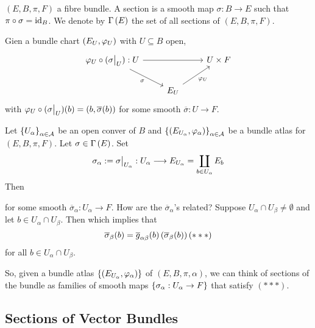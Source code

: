 \documentclass[main.tex]{subfiles}
\begin{document}
 $(E, B, \pi, F)$ a fibre bundle. A section is a smooth map $\sigma: B \to E$ such that $\pi \circ \sigma = \text{id}_{B}$. We denote by $\Gamma\left( E \right)$ the set of all sections of $(E, B, \pi, F)$. 

Gien a bundle chart $\left(  E_U, \varphi_U \right)$ with $U \subseteq B$ open,
\[
\begin{tikzcd}
\varphi_U \circ (\sigma \big|_U) : U \arrow[rd, "\sigma"'] \arrow[rr] &                              & U \times F \\
                                                                      & E_U \arrow[ru, "\varphi_U"'] &           
\end{tikzcd}
\]
with $\varphi_U \circ (\sigma\big|_{U})(b) = (b, \overline{\sigma}(b))$ for some smooth $\overline{\sigma}: U \to F.$

Let $\left\{U_\alpha\right\}_{\alpha \in \mathcal{A}}$ be an open conver of $B$
 and $\left\{ \left( E_{U_\alpha}, \varphi_\alpha \right) \right\}_{\alpha \in \mathcal{A}}$ be
 a bundle atlas for $(E, B, \pi, F)$. Let $\sigma \in \Gamma\left( E \right)$. Set 
 \[
 \sigma_\alpha := \sigma\big|_{U_\alpha}: U_\alpha \longrightarrow E_{U_\alpha} = \coprod_{b \in U_\alpha} E_b
 \]
 Then 
 
 for some smooth $\overline{\sigma}_\alpha: U_\alpha \to F$. How are the $\overline{\sigma}_\alpha$'s related? Suppose $U_\alpha \cap U_\beta \neq \emptyset$  and let $b \in U_\alpha \cap U_\beta$. Then
 which implies that 
 \[
    \overline{\sigma}_\beta(b) = \overline{g}_{\alpha\beta}(b)\left( \overline{\sigma}_\beta(b)  \right) (***)
 \] for all $b \in U_\alpha \cap U_\beta$.
 
 So, given a bundle atlas $\left\{ \left(  E_{U_\alpha}, \varphi_\alpha  \right)  \right\}$ of $(E, B, \pi, \alpha)$, we can think of sections of the bundle as families of smooth maps $\left\{ \sigma_\alpha : U_\alpha \to F\right\}$ that satisfy $(***)$. 
 
 \subsection{Sections of Vector Bundles}
 
\end{document}
